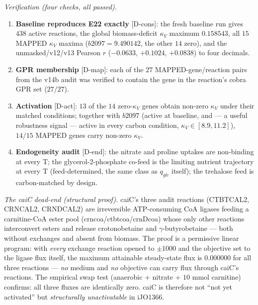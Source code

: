 \documentclass[11pt,a4paper]{article}
\theoremstyle{plain}
\theoremstyle{definition}
\theoremstyle{remark}
\begin{document}
\emph{Verification (four checks, all passed).}
\begin{enumerate}\itemsep0pt
\item \textbf{Baseline reproduces E22 exactly} {[D-cons]}: the fresh
  baseline run gives $438$ active reactions, the global
  biomass-deficit $\kappa_V$ maximum $0.158543$, all $15$ MAPPED
  $\kappa_V$ maxima ($b2097 = 9.490142$, the other $14$ zero), and
  the unmasked/v12/v13 Pearson $r$ ($-0.0633$, $+0.1024$, $+0.0838$)
  to four decimals.
\item \textbf{GPR membership} {[D-map]}: each of the $27$
  MAPPED-gene/reaction pairs from the v14b audit was verified to
  contain the gene in the reaction's cobra GPR set ($27/27$).
\item \textbf{Activation} {[D-act]}: $13$ of the $14$ zero-$\kappa_V$
  genes obtain non-zero $\kappa_V$ under their matched conditions;
  together with $b2097$ (active at baseline, and --- a useful
  robustness signal --- active in every carbon condition,
  $\kappa_V \in [8.9, 11.2]$), $14/15$ MAPPED genes carry non-zero
  $\kappa_V$.
\item \textbf{Endogeneity audit} {[D-end]}: the nitrate and proline
  uptakes are non-binding at every T; the glycerol-2-phosphate co-feed
  is the limiting nutrient trajectory at every T (feed-determined, the
  same class as $q_{glc}$ itself); the trehalose feed is
  carbon-matched by design.
\end{enumerate}

\emph{The \emph{caiC} dead-end (structural proof).} caiC's three
audit reactions (CTBTCAL2, CRNCAL2, CRNDCAL2) are irreversible
ATP-consuming CoA ligases feeding a carnitine-CoA ester pool
(crncoa/ctbtcoa/crnDcoa) whose only other reactions interconvert
esters and release crotonobetaine and $\gamma$-butyrobetaine --- both
without exchanges and absent from biomass. The proof is a permissive
linear program: with \emph{every} exchange reaction opened to
$\pm 1000$ and the objective set to the ligase flux itself, the
maximum attainable steady-state flux is $0.000000$ for all three
reactions --- \emph{no} medium and \emph{no} objective can carry flux
through caiC's reactions. The empirical swap test (anaerobic +
nitrate + $10$ mmol carnitine) confirms: all three fluxes are
identically zero. caiC is therefore not ``not yet activated'' but
\emph{structurally unactivatable} in iJO1366.
\end{document}
